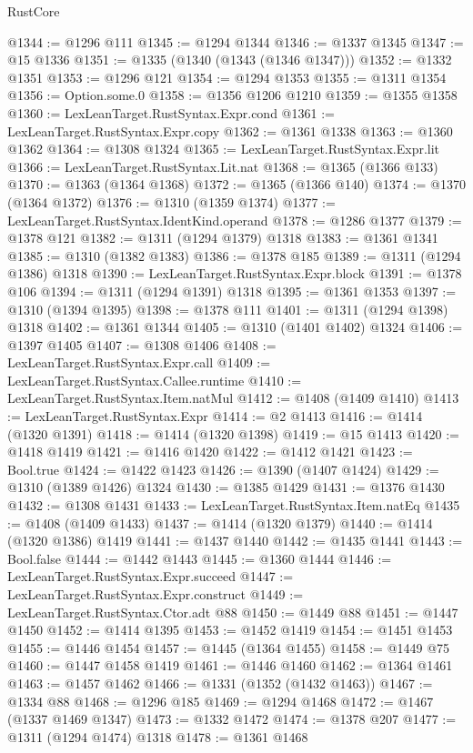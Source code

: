 \begin{lexlean}{RustCore}
\begin{coremodule}
@1344 := @1296 @111
@1345 := @1294 @1344
@1346 := @1337 @1345
@1347 := @15 @1336
@1351 := @1335 (@1340 (@1343 (@1346 @1347)))
@1352 := @1332 @1351
@1353 := @1296 @121
@1354 := @1294 @1353
@1355 := @1311 @1354
@1356 := Option.some.{0}
@1358 := @1356 @1206 @1210
@1359 := @1355 @1358
@1360 := LexLeanTarget.RustSyntax.Expr.cond
@1361 := LexLeanTarget.RustSyntax.Expr.copy
@1362 := @1361 @1338
@1363 := @1360 @1362
@1364 := @1308 @1324
@1365 := LexLeanTarget.RustSyntax.Expr.lit
@1366 := LexLeanTarget.RustSyntax.Lit.nat
@1368 := @1365 (@1366 @133)
@1370 := @1363 (@1364 @1368)
@1372 := @1365 (@1366 @140)
@1374 := @1370 (@1364 @1372)
@1376 := @1310 (@1359 @1374)
@1377 := LexLeanTarget.RustSyntax.IdentKind.operand
@1378 := @1286 @1377
@1379 := @1378 @121
@1382 := @1311 (@1294 @1379) @1318
@1383 := @1361 @1341
@1385 := @1310 (@1382 @1383)
@1386 := @1378 @185
@1389 := @1311 (@1294 @1386) @1318
@1390 := LexLeanTarget.RustSyntax.Expr.block
@1391 := @1378 @106
@1394 := @1311 (@1294 @1391) @1318
@1395 := @1361 @1353
@1397 := @1310 (@1394 @1395)
@1398 := @1378 @111
@1401 := @1311 (@1294 @1398) @1318
@1402 := @1361 @1344
@1405 := @1310 (@1401 @1402) @1324
@1406 := @1397 @1405
@1407 := @1308 @1406
@1408 := LexLeanTarget.RustSyntax.Expr.call
@1409 := LexLeanTarget.RustSyntax.Callee.runtime
@1410 := LexLeanTarget.RustSyntax.Item.natMul
@1412 := @1408 (@1409 @1410)
@1413 := LexLeanTarget.RustSyntax.Expr
@1414 := @2 @1413
@1416 := @1414 (@1320 @1391)
@1418 := @1414 (@1320 @1398)
@1419 := @15 @1413
@1420 := @1418 @1419
@1421 := @1416 @1420
@1422 := @1412 @1421
@1423 := Bool.true
@1424 := @1422 @1423
@1426 := @1390 (@1407 @1424)
@1429 := @1310 (@1389 @1426) @1324
@1430 := @1385 @1429
@1431 := @1376 @1430
@1432 := @1308 @1431
@1433 := LexLeanTarget.RustSyntax.Item.natEq
@1435 := @1408 (@1409 @1433)
@1437 := @1414 (@1320 @1379)
@1440 := @1414 (@1320 @1386) @1419
@1441 := @1437 @1440
@1442 := @1435 @1441
@1443 := Bool.false
@1444 := @1442 @1443
@1445 := @1360 @1444
@1446 := LexLeanTarget.RustSyntax.Expr.succeed
@1447 := LexLeanTarget.RustSyntax.Expr.construct
@1449 := LexLeanTarget.RustSyntax.Ctor.adt @88
@1450 := @1449 @88
@1451 := @1447 @1450
@1452 := @1414 @1395
@1453 := @1452 @1419
@1454 := @1451 @1453
@1455 := @1446 @1454
@1457 := @1445 (@1364 @1455)
@1458 := @1449 @75
@1460 := @1447 @1458 @1419
@1461 := @1446 @1460
@1462 := @1364 @1461
@1463 := @1457 @1462
@1466 := @1331 (@1352 (@1432 @1463))
@1467 := @1334 @88
@1468 := @1296 @185
@1469 := @1294 @1468
@1472 := @1467 (@1337 @1469 @1347)
@1473 := @1332 @1472
@1474 := @1378 @207
@1477 := @1311 (@1294 @1474) @1318
@1478 := @1361 @1468

\end{coremodule}
\end{lexlean}
